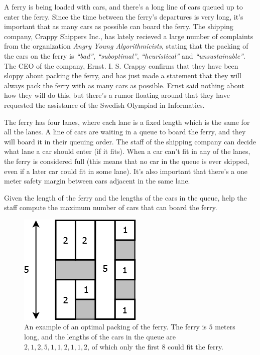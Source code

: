 A ferry is being loaded with cars, and there's a long line of cars queued up to enter the ferry.
Since the time between the ferry's departures is very long, it's important that as many cars as possible can board the ferry.
The shipping company, Crappy Shippers Inc., has lately recieved a large number of complaints from the organization \emph{Angry Young Algorithmicists}, stating that the packing of the cars on the ferry is \emph{``bad''}, \emph{``suboptimal''}, \emph{``heuristical''} and \emph{``unsustainable''}.
The CEO of the company, Ernst. I. S. Crappy confirms that they have been sloppy about packing the ferry, and has just made a statement that they will always pack the ferry with as many cars as possible.
Ernst said nothing about how they will do this, but there's a rumor floating around that they have requested the assistance of the Swedish Olympiad in Informatics.

The ferry has four lanes, where each lane is a fixed length which is the same for all the lanes.
A line of cars are waiting in a queue to board the ferry, and they will board it in their queuing order.
The staff of the shipping company can decide what lane a car should enter (if it fits).
When a car can't fit in any of the lanes, the ferry is considered full (this means that no car in the queue is ever skipped, even if a later car could fit in some lane).
It's also important that there's a one meter safety margin between cars adjacent in the same lane.

Given the length of the ferry and the lengths of the cars in the queue, help the staff compute the maximum number of cars that can board the ferry.

\begin{figure}[!h]
\begin{center}
\includegraphics[scale=0.5]{farjan}
\end{center}
\caption{An example of an optimal packing of the ferry. The ferry is $5$ meters long, and the lengths of the cars in the queue are $2, 1, 2, 5, 1, 1, 2, 1, 1, 2$, of which only the first $8$ could fit the ferry.}
\label{fig1}
\end{figure}

